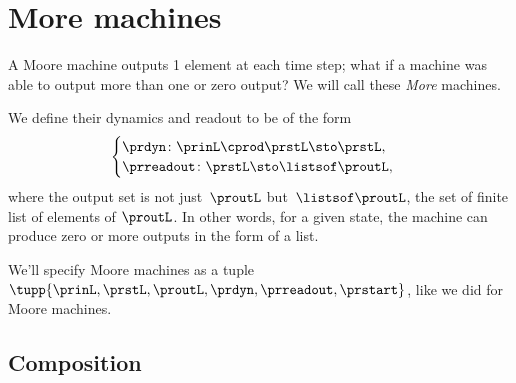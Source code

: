 
\section{More machines}
\label{sec:more-machines}

A Moore machine outputs 1 element at each time step; what if a machine was able to output more than one or zero output?
We will call these \emph{More} machines.

We define their dynamics and readout to be of the form
%
\begin{equation}
    \label{eq:more-signature}
    \begin{cases}
        \prdyn \colon  \prinL \cprod \prstL \sto \prstL, \\
        \prreadout \colon \prstL  \sto \listsof \proutL,
    \end{cases}
\end{equation}
%
where the output set is not just~$\proutL$ but~$\listsof \proutL$, the set of finite list of elements of $\proutL$.
In other words, for a given state, the machine can produce zero or more outputs in the form of a list.

We'll specify Moore machines as a tuple~$\tupp{\prinL,\prstL,\proutL,\prdyn,\prreadout,\prstart}$, like we did for Moore machines.

\subsection{Composition}

